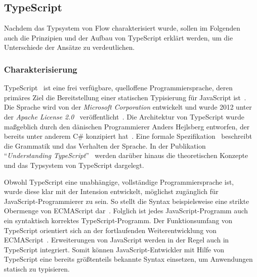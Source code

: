 \subsection{TypeScript}
\label{sec:typescript}

Nachdem das Typsystem von Flow charakterisiert wurde, sollen im Folgenden auch die Prinzipien und der Aufbau von TypeScript erklärt werden, um die Unterschiede der Ansätze zu verdeutlichen.

\subsubsection{Charakterisierung}

TypeScript~\autocite{TYPESCRIPT:SPEC} ist eine frei verfügbare, quelloffene Programmiersprache, deren primäres Ziel die Bereitstellung einer statischen Typisierung für JavaScript ist~\autocite[2]{BIERMAN:2014}. Die Sprache wird von der \textit{Microsoft Corporation} entwickelt und wurde 2012 unter der \textit{Apache License 2.0}~\autocite{LICENSE:APACHE20} veröffentlicht~\autocite{TYPESCRIPT:GITHUB}. Die Architektur von TypeScript wurde maßgeblich durch den dänischen Programmierer Anders Hejlsberg entworfen, der bereits unter anderem C\# konzipiert hat~\autocite{GITHUB:HEJLSBERG}. Eine formale Spezifikation~\autocite{TYPESCRIPT:SPEC} beschreibt die Grammatik und das Verhalten der Sprache. In der Publikation \enquote{\textit{Understanding TypeScript}}~\autocite{BIERMAN:2014} werden darüber hinaus die theoretischen Konzepte und das Typsystem von TypeScript dargelegt.

Obwohl TypeScript eine unabhängige, vollständige Programmiersprache ist, wurde diese klar mit der Intension entwickelt, möglichst zugänglich für JavaScript-Programmierer zu sein. So stellt die Syntax beispielsweise eine strikte Obermenge von ECMAScript dar~\autocite[25]{FLOW:PAPER}. Folglich ist jedes JavaScript-Programm auch ein syntaktisch korrektes TypeScript-Programm. Der Funktionsumfang von TypeScript orientiert sich an der fortlaufenden Weiterentwicklung von ECMAScript~\autocite[1]{BIERMAN:2014}. Erweiterungen von JavaScript werden in der Regel auch in TypeScript integriert. Somit können JavaScript-Entwickler mit Hilfe von TypeScript eine bereits größtenteils bekannte Syntax einsetzen, um Anwendungen statisch zu typisieren.

